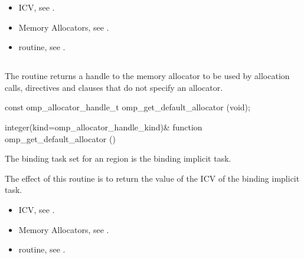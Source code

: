 \crossreferences

\begin{itemize}
\item {} ICV, see .
\item Memory Allocators, see .
\item {} routine, see .
\end{itemize}

\subsection{}
\label{subsec:omp_get_default_allocator}

\summary
The  routine returns a handle to the memory allocator to be used by allocation calls,  directives and  clauses that do not specify an allocator.

\format
\begin{ccppspecific}
\begin{ompcFunction}
const omp_allocator_handle_t omp_get_default_allocator (void);
\end{ompcFunction}
\end{ccppspecific}
\begin{fortranspecific}
\begin{ompfFunction}
integer(kind=omp_allocator_handle_kind)&
function omp_get_default_allocator ()
\end{ompfFunction}
\end{fortranspecific}

\binding

The binding task set for an  region is the binding implicit task.

\effect

The effect of this routine is to return the value of the  ICV of the binding implicit task.

\crossreferences
\begin{itemize}
\item {} ICV, see .
\item Memory Allocators, see .
\item {} routine, see .
\end{itemize}




